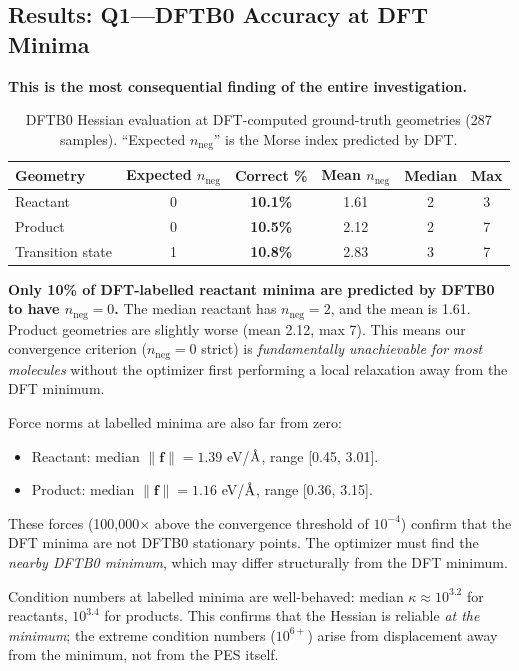\documentclass[11pt,a4paper]{article}
\newcommand{\vect}[1]{\mathbf{#1}}
\newcommand{\angstrom}{\text{\r{A}}}
\begin{document}
\subsection{Results: Q1---DFTB0 Accuracy at DFT Minima}
\label{sec:diagnostic-results}

\textbf{This is the most consequential finding of the entire investigation.}

\begin{table}[H]
\centering
\caption{DFTB0 Hessian evaluation at DFT-computed ground-truth geometries (287 samples). ``Expected $n_\text{neg}$'' is the Morse index predicted by DFT.}
\label{tab:dftb0-at-minima}
\begin{tabular}{lccccc}
\toprule
Geometry & Expected $n_\text{neg}$ & Correct \% & Mean $n_\text{neg}$ & Median & Max \\
\midrule
Reactant & 0 & \textbf{10.1\%} & 1.61 & 2 & 3 \\
Product & 0 & \textbf{10.5\%} & 2.12 & 2 & 7 \\
Transition state & 1 & \textbf{10.8\%} & 2.83 & 3 & 7 \\
\bottomrule
\end{tabular}
\end{table}

\textbf{Only 10\% of DFT-labelled reactant minima are predicted by DFTB0 to have $n_\text{neg} = 0$.} The median reactant has $n_\text{neg} = 2$, and the mean is 1.61. Product geometries are slightly worse (mean 2.12, max 7). This means our convergence criterion ($n_\text{neg} = 0$ strict) is \emph{fundamentally unachievable for most molecules} without the optimizer first performing a local relaxation away from the DFT minimum.

Force norms at labelled minima are also far from zero:
\begin{itemize}
  \item Reactant: median $\|\vect{f}\| = 1.39$ eV/$\angstrom$, range [0.45, 3.01].
  \item Product: median $\|\vect{f}\| = 1.16$ eV/$\angstrom$, range [0.36, 3.15].
\end{itemize}
These forces (100,000$\times$ above the convergence threshold of $10^{-4}$) confirm that the DFT minima are not DFTB0 stationary points. The optimizer must find the \emph{nearby DFTB0 minimum}, which may differ structurally from the DFT minimum.

Condition numbers at labelled minima are well-behaved: median $\kappa \approx 10^{3.2}$ for reactants, $10^{3.4}$ for products. This confirms that the Hessian is reliable \emph{at the minimum}; the extreme condition numbers ($10^{6+}$) arise from displacement away from the minimum, not from the PES itself.
\end{document}
